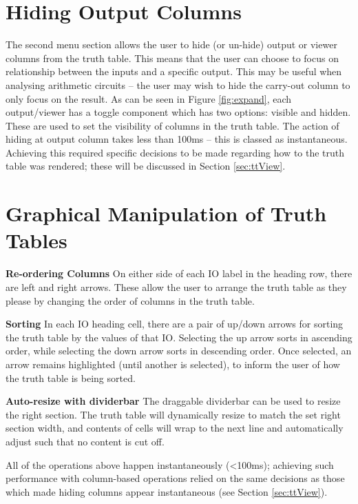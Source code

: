 \section{Hiding Output Columns}
The second menu section allows the user to hide (or un-hide) output or viewer columns from the truth table. This means that the user can choose to focus on relationship between the inputs and a specific output. This may be useful when analysing arithmetic circuits -- the user may wish to hide the carry-out column to only focus on the result. As can be seen in Figure \ref{fig:expand}, each output/viewer has a toggle component which has two options: visible and hidden. These are used to set the visibility of columns in the truth table. The action of hiding at output column takes less than 100ms -- this is classed as instantaneous. Achieving this required specific decisions to be made regarding how to the truth table was rendered; these will be discussed in Section \ref{sec:ttView}.

\section{Graphical Manipulation of Truth Tables}
\textbf{Re-ordering Columns} On either side of each IO label in the heading row, there are left and right arrows. These allow the user to arrange the truth table as they please by changing the order of columns in the truth table.

\textbf{Sorting} In each IO heading cell, there are a pair of up/down arrows for sorting the truth table by the values of that IO. Selecting the up arrow sorts in ascending order, while selecting the down arrow sorts in descending order. Once selected, an arrow remains highlighted (until another is selected), to inform the user of how the truth table is being sorted. 

\textbf{Auto-resize with dividerbar} The draggable dividerbar can be used to resize the right section. The truth table will dynamically resize to match the set right section width, and contents of cells will wrap to the next line and automatically adjust such that no content is cut off.

All of the operations above happen instantaneously (<100ms); achieving such performance with column-based operations relied on the same decisions as those which made hiding columns appear instantaneous (see Section \ref{sec:ttView}).

